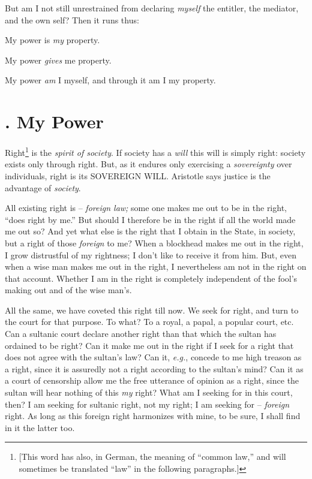 But am I not still unrestrained from declaring \textit{myself} the entitler, 
the mediator, and the own self? Then it runs thus:

My power is \textit{my} property.

My power \textit{gives} me property.

My power \textit{am} I myself, and through it am I my property.

\section[1. My Power]{. My Power}

Right\footnote{[This word has also, in German, the meaning of ``common 
law,'' and will sometimes be translated ``law'' in the following 
paragraphs.]} is the \textit{spirit of society}. If society has a 
\textit{will} this will is simply right: society exists only through right. 
But, as it endures only exercising a \textit{sovereignty} over individuals, 
right is its SOVEREIGN WILL. Aristotle says justice is the advantage of 
\textit{society}.

All existing right is -- \textit{foreign law;} some one makes me out to be in 
the right, ``does right by me.'' But should I therefore be in the right if 
all the world made me out so? And yet what else is the right that I obtain in 
the State, in society, but a right of those \textit{foreign} to me? When a 
blockhead makes me out in the right, I grow distrustful of my rightness; I 
don't like to receive it from him. But, even when a wise man makes me out in 
the right, I nevertheless am not in the right on that account. Whether I am in 
the right is completely independent of the fool's making out and of the wise 
man's.

All the same, we have coveted this right till now. We seek for right, and turn 
to the court for that purpose. To what? To a royal, a papal, a popular court, 
etc. Can a sultanic court declare another right than that which the sultan has 
ordained to be right? Can it make me out in the right if I seek for a right 
that does not agree with the sultan's law? Can it, \textit{e.g.}, concede to 
me high treason as a right, since it is assuredly not a right according to the 
sultan's mind? Can it as a court of censorship allow me the free utterance of 
opinion as a right, since the sultan will hear nothing of this \textit{my} 
right? What am I seeking for in this court, then? I am seeking for sultanic 
right, not my right; I am seeking for -- \textit{foreign} right. As long as 
this foreign right harmonizes with mine, to be sure, I shall find in it the 
latter too.

